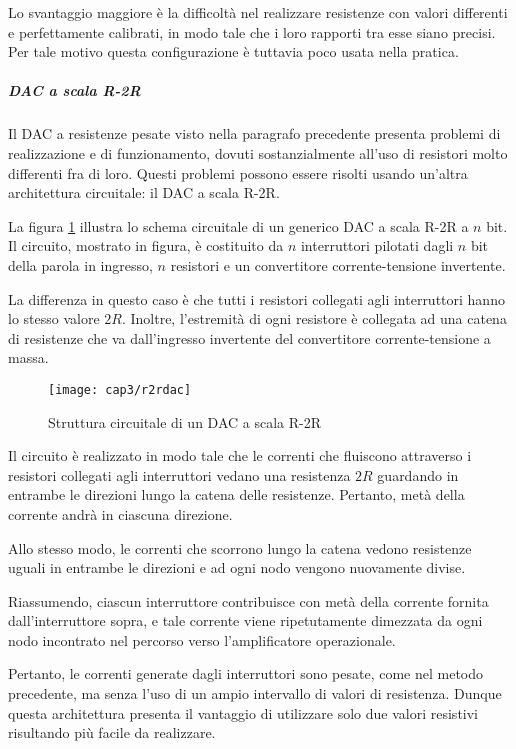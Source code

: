 Lo svantaggio maggiore è la difficoltà nel realizzare resistenze con valori differenti e perfettamente calibrati, in modo tale che i loro rapporti tra esse siano precisi.
Per tale motivo questa configurazione è tuttavia poco usata nella pratica.

\subparagraph{\textbf{DAC a scala R-2R}}
Il DAC a resistenze pesate visto nella paragrafo precedente presenta problemi di realizzazione e di funzionamento, dovuti sostanzialmente all'uso di resistori molto differenti fra di loro. Questi problemi possono essere risolti usando un'altra architettura circuitale: il DAC a scala R-2R.

La figura \ref{r2rdac} illustra lo schema circuitale di un generico DAC a scala R-2R a $n$ bit.
Il circuito, mostrato in figura, è costituito da $n$ interruttori pilotati dagli $n$ bit della parola in ingresso, $n$ resistori e un convertitore corrente-tensione invertente. 

La differenza in questo caso è che tutti i resistori collegati agli interruttori hanno lo stesso valore $2R$. Inoltre, l'estremità di ogni resistore è collegata ad una catena di resistenze che va dall'ingresso invertente del convertitore corrente-tensione a massa.
\begin{figure}  
  \begin{center}
    \texttt{[image: cap3/r2rdac]}
    \caption{Struttura circuitale di un DAC a scala R-2R}
    \label{r2rdac}
  \end{center}
\end{figure}

Il circuito è realizzato in modo tale che le correnti che fluiscono attraverso i resistori collegati agli interruttori vedano una resistenza $2R$ guardando in entrambe le direzioni lungo la catena delle resistenze. Pertanto, metà della corrente andrà in ciascuna direzione. 

Allo stesso modo, le correnti che scorrono lungo la catena vedono resistenze uguali in entrambe le direzioni e ad ogni nodo vengono nuovamente divise.

Riassumendo, ciascun interruttore contribuisce con metà della corrente fornita dall'interruttore sopra, e tale corrente viene ripetutamente dimezzata da ogni nodo incontrato nel percorso verso l'amplificatore operazionale.

Pertanto, le correnti generate dagli interruttori sono pesate, come nel metodo precedente, ma senza l'uso di un ampio intervallo di valori di resistenza. Dunque questa architettura presenta il vantaggio di utilizzare solo due valori resistivi risultando più facile da realizzare.

